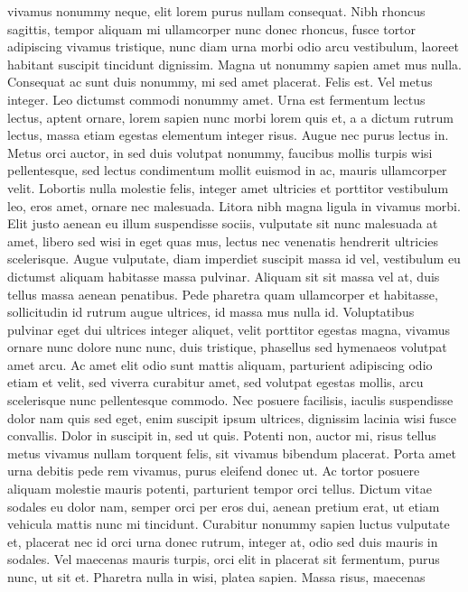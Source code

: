 \begin{remark}
 vivamus nonummy neque, elit lorem purus nullam consequat. Nibh rhoncus
 sagittis, tempor aliquam mi ullamcorper nunc donec rhoncus, fusce tortor
 adipiscing vivamus tristique, nunc diam urna morbi odio arcu vestibulum,
 laoreet habitant suscipit tincidunt dignissim. Magna ut nonummy sapien amet
 mus nulla.
 Consequat ac sunt duis nonummy, mi sed amet placerat. Felis est. Vel metus
 integer. Leo dictumst commodi nonummy amet. Urna est fermentum lectus lectus,
 aptent ornare, lorem sapien nunc morbi lorem quis et, a a dictum rutrum
 lectus, massa etiam egestas elementum integer risus. Augue nec purus lectus
 in. Metus orci auctor, in sed duis volutpat nonummy, faucibus mollis turpis
 wisi pellentesque, sed lectus condimentum mollit euismod in ac, mauris
 ullamcorper velit. Lobortis nulla molestie felis, integer amet ultricies et
 porttitor vestibulum leo, eros amet, ornare nec malesuada. Litora nibh magna
 ligula in vivamus morbi. Elit justo aenean eu illum suspendisse sociis,
 vulputate sit nunc malesuada at amet, libero sed wisi in eget quas mus, lectus
 nec venenatis hendrerit ultricies scelerisque. Augue vulputate, diam imperdiet
 suscipit massa id vel, vestibulum eu dictumst aliquam habitasse massa
 pulvinar. Aliquam sit sit massa vel at, duis tellus massa aenean penatibus.
 Pede pharetra quam ullamcorper et habitasse, sollicitudin id rutrum augue
 ultrices, id massa mus nulla id. Voluptatibus pulvinar eget dui ultrices
 integer aliquet, velit porttitor egestas magna, vivamus ornare nunc dolore
 nunc nunc, duis tristique, phasellus sed hymenaeos volutpat amet arcu. Ac amet
 elit odio sunt mattis aliquam, parturient adipiscing odio etiam et velit, sed
 viverra curabitur amet, sed volutpat egestas mollis, arcu scelerisque nunc
 pellentesque commodo. Nec posuere facilisis, iaculis suspendisse dolor nam
 quis sed eget, enim suscipit ipsum ultrices, dignissim lacinia wisi fusce
 convallis. Dolor in suscipit in, sed ut quis. Potenti non, auctor mi, risus
 tellus metus vivamus nullam torquent felis, sit vivamus bibendum placerat.
 Porta amet urna debitis pede rem vivamus, purus eleifend donec ut. Ac tortor
 posuere aliquam molestie mauris potenti, parturient tempor orci tellus. Dictum
 vitae sodales eu dolor nam, semper orci per eros dui, aenean pretium erat, ut
 etiam vehicula mattis nunc mi tincidunt. Curabitur nonummy sapien luctus
 vulputate et, placerat nec id orci urna donec rutrum, integer at, odio sed
 duis mauris in sodales.
 Vel maecenas mauris turpis, orci elit in placerat sit fermentum, purus nunc,
 ut sit et. Pharetra nulla in wisi, platea sapien. Massa risus, maecenas

\end{remark}

